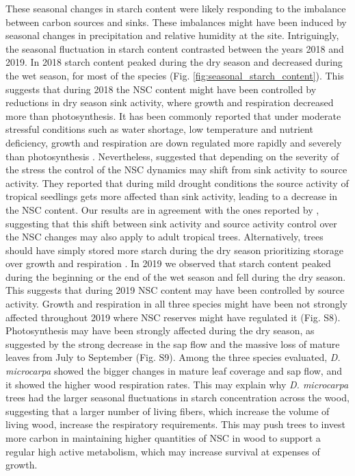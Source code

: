 \documentclass{article}
\begin{document}
These seasonal changes in starch content were likely responding to the imbalance between carbon sources and sinks. These imbalances might have been induced by seasonal changes in precipitation and relative humidity at the site. Intriguingly, the seasonal fluctuation in starch content contrasted between the years 2018 and 2019. In 2018 starch content peaked during the dry season and decreased during the wet season, for most of the species (Fig. \ref{fig:seasonal_starch_content}). This suggests that during 2018 the NSC content might have been controlled by reductions in dry season sink activity, where growth and respiration decreased more than photosynthesis. It has been commonly reported that under moderate stressful conditions such as water shortage, low temperature and nutrient deficiency, growth and respiration are down regulated more rapidly and severely than photosynthesis  \citep{Hoch:2003ui, Korner:2003, Wurth:2005, Hartmann:2015}. Nevertheless, \citet{Obrien:2015} suggested that depending on the severity of the stress the control of the NSC dynamics may shift from sink activity to source activity. They reported that during mild drought conditions the source activity of tropical seedlings gets more affected than sink activity, leading to a decrease in the NSC content. Our results are in agreement with the ones reported by \citet{Obrien:2015}, suggesting that this shift between sink activity and source activity control over the NSC changes may also apply to adult tropical trees. Alternatively, trees should have simply stored more starch during the dry season prioritizing storage over growth and respiration \citep{Huan:2019}. In 2019 we observed that starch content peaked during the beginning or the end of the wet season and fell during the dry season. This suggests that during 2019 NSC content may have been controlled by source activity. Growth and respiration in all three species might have been not strongly affected throughout 2019 where NSC reserves might have regulated it (Fig. S8). Photosynthesis may have been strongly affected during the dry season, as suggested by the strong decrease in the sap flow and the massive loss of mature leaves from July to September (Fig. S9). Among the three species evaluated, \textit{D. microcarpa} showed the bigger changes in mature leaf coverage and sap flow, and it showed the higher wood respiration rates. This may explain why \textit{D. microcarpa} trees had the larger seasonal fluctuations in starch concentration across the wood, suggesting that a larger number of living fibers, which increase the volume of living wood, increase the respiratory requirements. This may push trees to invest more carbon in maintaining higher quantities of NSC in wood to support a regular high active metabolism, which may increase survival at expenses of growth.
\end{document}
